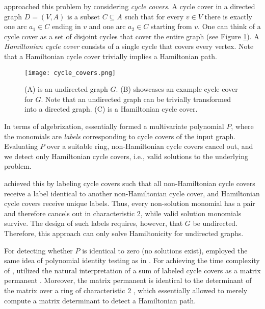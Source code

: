 \citeauthor{Björklund14} approached this problem by considering \emph{cycle covers}. 
A cycle cover in a directed graph $D = (V, A)$ is a 
subset $C \subseteq A$ such that for every $v \in V$ there is exactly one arc $a_1 \in C$ ending in $v$ 
and one arc $a_2 \in C$ starting from $v$. One can think of a cycle cover as a set of disjoint 
cycles that cover the entire graph (see Figure \ref{fig:cycle_covers}). 
A \emph{Hamiltonian cycle cover} consists of a single cycle that covers every vertex. 
Note that a Hamiltonian cycle cover trivially implies a Hamiltonian path.

\begin{figure}[h]
  \texttt{[image: cycle\_covers.png]}
  \centering
  \caption{(A) is an undirected graph $G$. (B) showcases an example cycle cover for $G$. 
  Note that an undirected graph can be trivially transformed into a directed graph. 
  (C) is a Hamiltonian cycle cover.}
  \label{fig:cycle_covers}
\end{figure}

In terms of algebrization, 
\citeauthor{Björklund14} essentially formed 
a multivariate polynomial $P$, where the monomials are 
\emph{labels} corresponding 
to cycle covers of the input graph. Evaluating $P$ over a suitable ring, 
non-Hamiltonian cycle covers cancel out, and we detect 
only Hamiltonian cycle covers, i.e., valid solutions to the underlying problem.

\citeauthor{Björklund14} achieved this by labeling cycle covers such 
that all non-Hamiltonian cycle covers receive a label identical 
to another non-Hamiltonian cycle cover, 
and Hamiltonian cycle covers receive unique labels. 
Thus, every non-solution monomial has a pair and therefore 
cancels out in characteristic 2, while valid solution monomials survive. 
The design of such labels requires, however, that $G$ be undirected. 
Therefore, this approach can only solve Hamiltonicity for undirected graphs.

For detecting whether $P$ is identical to zero (no solutions exist), \citeauthor{Björklund14} 
employed the same idea of polynomial identity testing as in .
For achieving the time complexity of , \citeauthor{Björklund14} 
utilized the natural interpretation of a sum of labeled cycle covers as 
a matrix permanent \cite{Björklund14}. 
Moreover, the matrix permanent
is identical to the determinant of the matrix 
over a ring of characteristic 2 \cite{Björklund14}, 
which essentially allowed \citeauthor{Björklund14} to merely compute a matrix determinant 
to detect a Hamiltonian path.

